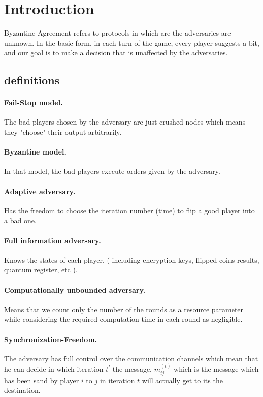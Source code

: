 

\section{Introduction} 
Byzantine Agreement refers to protocols in which are the adversaries are unknown. In the basic form, in each turn of the game, every player suggests a bit, and our goal is to make a decision that is unaffected by the adversaries. 

\subsection{definitions}

\paragraph{Fail-Stop model.} 
The bad players chosen by the adversary are just crushed nodes which means they "choose" their output arbitrarily.
\paragraph{Byzantine model.} 
In that model, the bad players execute orders given by the adversary.  
\paragraph{Adaptive adversary.} Has the freedom to choose the iteration number (time) to flip a good player into a bad one. 
\paragraph{Full information adversary.} Knows the states of each player. ( including encryption keys, flipped coins results, quantum register, etc ).  
\paragraph{Computationally unbounded adversary.} Means that we count only the number of the rounds as a resource parameter while considering the required computation time in each round as negligible.   
\paragraph{Synchronization-Freedom.}
The adversary has full control over the communication channels which mean that he can decide in which iteration \( t^{\prime} \) the message, \( m_{ij}^{(t)} \) which is the message which has been sand by player \( i \) to \(j \) in iteration \( t \) will actually get to its the destination.  

